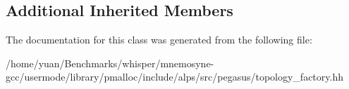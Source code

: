 \subsection*{Additional Inherited Members}


The documentation for this class was generated from the following file\+:\begin{DoxyCompactItemize}
\item 
/home/yuan/\+Benchmarks/whisper/mnemosyne-\/gcc/usermode/library/pmalloc/include/alps/src/pegasus/topology\+\_\+factory.\+hh\end{DoxyCompactItemize}
